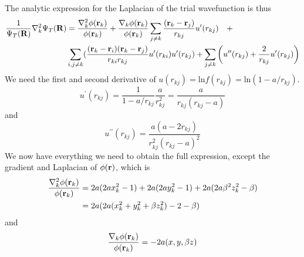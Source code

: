 \documentclass[english, a4paper]{article}
\begin{document}
The analytic expression for the Laplacian of the trial wavefunction is thus
\begin{align}
 \frac{1}{\Psi_T({\bf R})}\nabla^2_k\Psi_T({\bf R}) &= 
 \frac{\nabla^2_k\phi({\bf r}_k)}{\phi({\bf r}_k)} + \frac{\nabla_k\phi({\bf r}_k)}{\phi({\bf r}_k)} 
 \sum_{j\neq k}\frac{({\bf r}_k - {\bf r}_j)}{r_{kj}} u^\prime(r_{kj}) \quad + \\
 &\sum_{i,j\neq k} (\frac{({\bf r}_k - {\bf r}_i)({\bf r}_k - {\bf r}_j)}{r_{ki}r_{kj}} u^\prime(r_{ki})u^\prime(r_{kj})
 + \sum_{j\neq k}\left( u^{\prime\prime}(r_{kj}) + \frac{2}{r_{kj}} u^\prime(r_{kj}) \right)
 \label{analytickin}
\end{align}
We need the first and second derivative of $u(r_{kj}) = \textrm{ln} f(r_{kj}) = \textrm{ln} (1-a/r_{kj})$.
\begin{equation}
 u^\prime(r_{kj}) = \frac{1}{1-a/r_{kj}} 
 \frac{a}{r^2_{kj}} = \frac{a}{r_{kj}(r_{kj} - a)}
\end{equation}
and
\begin{equation}
 u^{\prime\prime}(r_{kj}) = \frac{a(a - 2r_{kj})}{r_{kj}^2 ( r_{kj} - a)^2}
\end{equation}
We now have everything we need to obtain the full expression, except the gradient and Laplacian of
$\phi({\bf r})$, which is
\begin{align}
 \frac{\nabla^2_k\phi({\bf r}_k)}{\phi({\bf r}_k)} &= 2a(2ax_k^2 - 1) + 2a(2ay_k^2 - 1) + 2a(2a\beta^2z_k^2 - \beta) \\
 &= 2a(2a(x_k^2 + y_k^2 + \beta z_k^2) - 2 - \beta)
\end{align}
and
\begin{equation}
 \frac{\nabla_k\phi({\bf r}_k)}{\phi({\bf r}_k)}  = 
 -2a(x, y, \beta z)
\end{equation}
\end{document}
